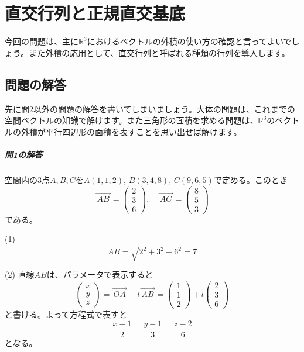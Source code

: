 \chapter{直交行列と正規直交基底}

今回の問題は、主に$\mathbb{R}^3$におけるベクトルの外積の使い方の確認と言ってよいでしょう。また外積の応用として、直交行列と呼ばれる種類の行列を導入します。

\section{問題の解答}
先に問2以外の問題の解答を書いてしまいましょう。大体の問題は、これまでの空間ベクトルの知識で解けます。また三角形の面積を求める問題は、$\mathbb{R}^3$のベクトルの外積が平行四辺形の面積を表すことを思い出せば解けます。

\paragraph{問1の解答} 空間内の$3$点$A, B, C$を$A(1, 1, 2)$, $B(3, 4, 8)$, $C(9, 6, 5)$で定める。このとき
\[
\overrightarrow{\,AB\,} = 
\begin{pmatrix}
2 \\
3 \\
6
\end{pmatrix}, \quad
\overrightarrow{\,AC\,}
=
\begin{pmatrix}
8 \\
5 \\
3
\end{pmatrix}
\]
である。

\noindent (1)
\[
AB = \sqrt{ 2^2 + 3^2 + 6^2 } = 7
\]

\noindent (2) 直線$AB$は、パラメータで表示すると
\[
\begin{pmatrix}
x \\
y \\
z
\end{pmatrix}
=
\overrightarrow{\,OA\,} + t\overrightarrow{\,AB\,}
=
\begin{pmatrix}
1 \\
1 \\
2
\end{pmatrix}
+ t
\begin{pmatrix}
2 \\
3 \\
6
\end{pmatrix}
\]
と書ける。よって方程式で表すと
\[
\frac{x - 1}{2} = \frac{y - 1}{3} = \frac{z - 2}{6}
\]
となる。

